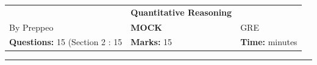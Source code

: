 \documentclass[11pt,paper=a4,answers]{exam}
\begin{document}
\begin{center}
    \centering
    \renewcommand{\arraystretch}{1.5}
    \begin{tabularx}{\textwidth}{YYY}
    & \normalsize\bf{{\Large{{Quantitative Reasoning}}}} & \\
    By Preppeo & \normalsize\bf{MOCK } & GRE\\
    \normalsize{\textbf{Questions:} 15 (Section 2 : 15} & \normalsize{\textbf{Marks:} 15} & \normalsize{\textbf{Time:}  minutes } \\
    \end{tabularx}
\end{center}
\par\noindent\rule{\textwidth}{1pt}
\end{document}
